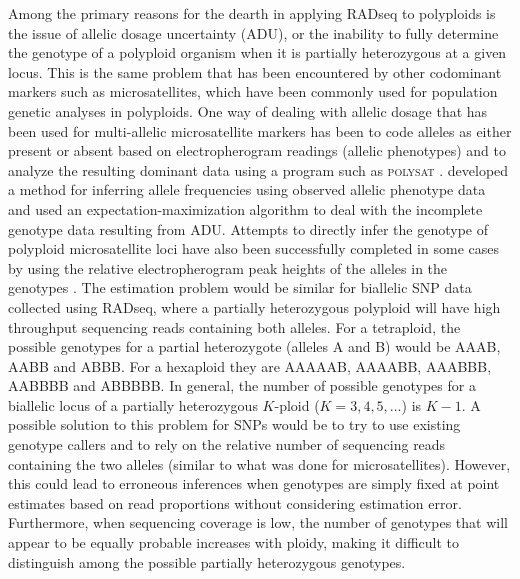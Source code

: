 \documentclass[11pt,english,letterpaper,oneside]{article}
\begin{document}
Among the primary reasons for the dearth in applying RADseq to polyploids is the issue of allelic dosage uncertainty (ADU), or the inability to fully determine the genotype of a polyploid organism when it is partially heterozygous at a given locus. This is the same problem that has been encountered by other codominant markers such as microsatellites, which have been commonly used for population genetic analyses in polyploids. One way of dealing with allelic dosage that has been used for multi-allelic microsatellite markers has been to code alleles as either present or absent based on electropherogram readings (allelic phenotypes) and to analyze the resulting dominant data using a program such as \textsc{polysat} \citep{clark2007polysat,dufresne2014polyPopGen}. \cite{deSilva2005alleleFreqs} developed a method for inferring allele frequencies using observed allelic phenotype data and used an expectation-maximization algorithm to deal with the incomplete genotype data resulting from ADU. Attempts to directly infer the genotype of polyploid microsatellite loci have also been successfully completed in some cases by using the relative electropherogram peak heights of the alleles in the genotypes \citep{esselink2004polyploidSSR}. The estimation problem would be similar for biallelic SNP data collected using RADseq, where a partially heterozygous polyploid will have high throughput sequencing reads containing both alleles. For a tetraploid, the possible genotypes for a partial heterozygote (alleles A and B) would be AAAB, AABB and ABBB. For a hexaploid they are AAAAAB, AAAABB, AAABBB, AABBBB and ABBBBB. In general, the number of possible genotypes for a biallelic locus of a partially heterozygous $K$-ploid ($K=3,4,5,\ldots$) is $K-1$. A possible solution to this problem for SNPs would be to try to use existing genotype callers and to rely on the relative number of sequencing reads containing the two alleles (similar to what was done for microsatellites). However, this could lead to erroneous inferences when genotypes are simply fixed at point estimates based on read proportions without considering estimation error. Furthermore, when sequencing coverage is low, the number of genotypes that will appear to be equally probable increases with ploidy, making it difficult to distinguish among the possible partially heterozygous genotypes.
\medskip
\end{document}
